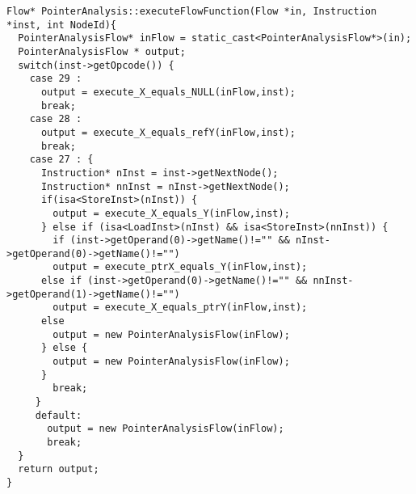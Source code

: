 \begin{lstlisting}[caption=PointerAnalysis Flow Functions, label=PAFF]
Flow* PointerAnalysis::executeFlowFunction(Flow *in, Instruction *inst, int NodeId){
  PointerAnalysisFlow* inFlow = static_cast<PointerAnalysisFlow*>(in);
  PointerAnalysisFlow * output;
  switch(inst->getOpcode()) {
    case 29 :
      output = execute_X_equals_NULL(inFlow,inst);
      break;
    case 28 :
      output = execute_X_equals_refY(inFlow,inst);
      break;
    case 27 : {
      Instruction* nInst = inst->getNextNode();
      Instruction* nnInst = nInst->getNextNode();
      if(isa<StoreInst>(nInst)) {
        output = execute_X_equals_Y(inFlow,inst);
      } else if (isa<LoadInst>(nInst) && isa<StoreInst>(nnInst)) {
        if (inst->getOperand(0)->getName()!="" && nInst->getOperand(0)->getName()!="")
        output = execute_ptrX_equals_Y(inFlow,inst);
      else if (inst->getOperand(0)->getName()!="" && nnInst->getOperand(1)->getName()!="")
        output = execute_X_equals_ptrY(inFlow,inst);
      else
        output = new PointerAnalysisFlow(inFlow);
      } else {
        output = new PointerAnalysisFlow(inFlow);
      }
        break;
     }
     default:
       output = new PointerAnalysisFlow(inFlow);
       break;
  }
  return output;
}
\end{lstlisting}



